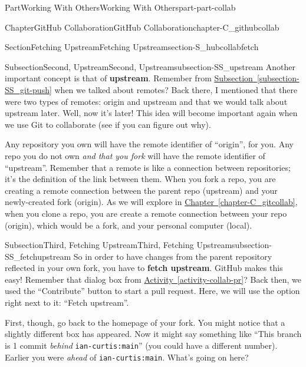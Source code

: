 \documentclass[oneside,10pt,]{book}
\newcommand{\xreffont}{\relax}
\newcommand{\mono}[1]{\texttt{#1}}
\newcommand{\terminology}[1]{\textbf{#1}}
\begin{document}
\begin{partptx}{Part}{Working With Others}{}{Working With Others}{}{}{part-part-collab}
\begin{chapterptx}{Chapter}{GitHub Collaboration}{}{GitHub Collaboration}{}{}{chapter-C_githubcollab}
\begin{sectionptx}{Section}{Fetching Upstream}{}{Fetching Upstream}{}{}{section-S_hubcollabfetch}
\typeout{************************************************}
%
\begin{subsectionptx}{Subsection}{Second, Upstream}{}{Second, Upstream}{}{}{subsection-SS_upstream}
%
%
Another important concept is that of \terminology{upstream}. Remember from \hyperref[subsection-SS_git-push]{Subsection~{\xreffont\ref{subsection-SS_git-push}}} when we talked about remotes? Back there, I mentioned that there were two types of remotes: origin and upstream and that we would talk about upstream later. Well, now it's later! This idea will become important again when we use Git to collaborate (see if you can figure out why).%
\par
Any repository you own will have the remote identifier of ``origin'', for you. Any repo you do not own \emph{and that you fork} will have the remote identifier of ``upstream''. Remember that a remote is like a connection between repositories; it's the definition of the link between them. When you fork a repo, you are creating a remote connection between the parent repo (upstream) and your newly-created fork (origin). As we will explore in \hyperref[chapter-C_gitcollab]{Chapter~{\xreffont\ref{chapter-C_gitcollab}}}, when you clone a repo, you are create a remote connection between your repo (origin), which would be a fork, and your personal computer (local).%
\end{subsectionptx}
%
%
\typeout{************************************************}
\typeout{************************************************}
%
\begin{subsectionptx}{Subsection}{Third, Fetching Upstream}{}{Third, Fetching Upstream}{}{}{subsection-SS_fetchupstream}
%
%
So in order to have changes from the parent repository reflected in your own fork, you have to \terminology{fetch upstream}. GitHub makes this easy! Remember that dialog box from \hyperref[activity-collab-pr]{Activity~{\xreffont\ref{activity-collab-pr}}}? Back then, we used the ``Contribute'' button to start a pull request. Here, we will use the option right next to it: ``Fetch upstream''.%
\par
First, though, go back to the homepage of your fork. You might notice that a slightly different box has appeared. Now it might say something like ``This branch is 1 commit \emph{behind} \mono{ian-curtis:main}'' (you could have a different number). Earlier you were \emph{ahead} of \mono{ian-curtis:main}. What's going on here?%

\end{subsectionptx}
\end{sectionptx}
\end{chapterptx}
\end{partptx}
\end{document}
